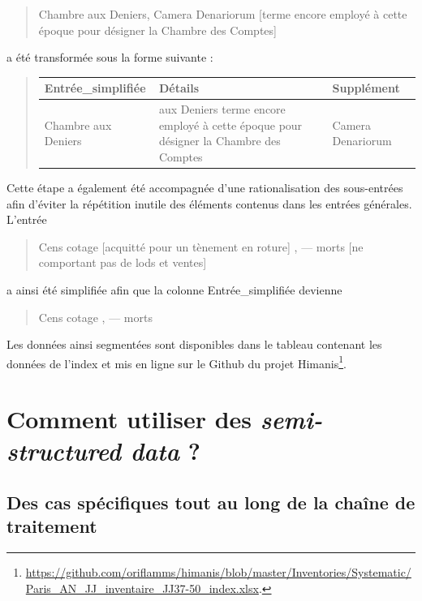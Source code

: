 \documentclass[a4paper,12pt,twoside]{book}
\begin{document}
	\begin{quotation}
		Chambre aux Deniers, Camera Denariorum [terme encore employé à cette époque pour 	désigner la Chambre des Comptes]
	\end{quotation}

	\noindent a été transformée sous la forme suivante :

	\begin{quotation}
		\begin{tabular}{|p{4cm}|p{4cm}|p{4cm}|}
			\hline
			Entrée\_simplifiée & Détails & Supplément \\ \hline
			Chambre aux Deniers & aux Deniers	terme encore employé à cette époque pour désigner la Chambre des Comptes & Camera Denariorum \\ \hline
		\end{tabular}
	\end{quotation}
	
	\noindent Cette étape a également été accompagnée d'une rationalisation des sous-entrées afin d'éviter la répétition inutile des éléments contenus dans les entrées générales. L'entrée
	
	\begin{quotation}
		Cens cotage [acquitté pour un tènement en roture] , — morts [ne comportant pas de lods et ventes]
	\end{quotation}

	\noindent a ainsi été simplifiée afin que la colonne \og Entrée\_simplifiée\fg{} devienne
	
	\begin{quotation}
		Cens cotage , — morts
	\end{quotation}

	\noindent Les données ainsi segmentées sont disponibles dans le tableau contenant les données de l'index et mis en ligne sur le Github du projet Himanis\footnote{\url{https://github.com/oriflamms/himanis/blob/master/Inventories/Systematic/Paris_AN_JJ_inventaire_JJ37-50_index.xlsx}.}.
	
	\section{Comment utiliser des \textit{semi-structured data} ?}
	
	\subsection{Des cas spécifiques tout au long de la chaîne de traitement}
	
\end{document}

